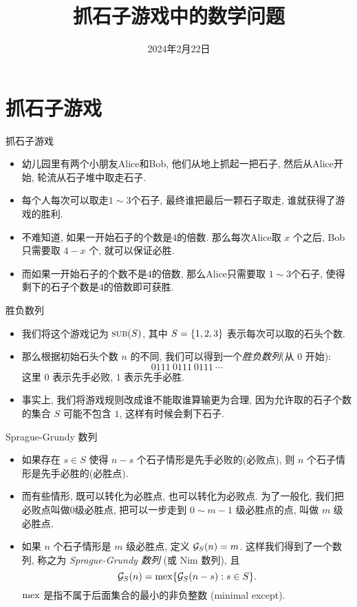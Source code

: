 \documentclass[aspectratio=169,handout]{ctexbeamer}
\title{抓石子游戏中的数学问题}
\date{2024年2月22日}
\DeclareMathOperator*{\SUB}{{\text{{\upshape\textsc{sub}}}}}
\begin{document}
\section{抓石子游戏}
\begin{frame}{抓石子游戏}
	\begin{itemize}
		\item 幼儿园里有两个小朋友Alice和Bob, 他们从地上抓起一把石子, 然后从Alice开始, 轮流从石子堆中取走石子.
		\item 每个人每次可以取走$1\sim3$个石子, 最终谁把最后一颗石子取走, 谁就获得了游戏的胜利.
		\item 不难知道, 如果一开始石子的个数是$4$的倍数. 那么每次Alice取 \alert{$x$} 个之后, Bob只需要取 \alert{$4-x$} 个, 就可以保证必胜.
		\item 而如果一开始石子的个数不是$4$的倍数, 那么Alice只需要取 $1\sim 3$个石子, 使得剩下的石子个数是$4$的倍数即可获胜.
	\end{itemize}
\end{frame}


\begin{frame}{胜负数列}
	\begin{itemize}
		\item 我们将这个游戏记为 $\SUB(S)$, 其中 $S={\left\{1,2,3\right\}}$ 表示每次可以取的石头个数.
		\item 那么根据初始石头个数 $n$ 的不同, 我们可以得到一个\emph{胜负数列}(从 $0$ 开始):
		\[0111\ 0111\ 0111\ \cdots\]
		这里 $0$ 表示先手必败, $1$ 表示先手必胜.
		\item 事实上, 我们将游戏规则改成\alert{谁不能取谁算输}更为合理, 因为允许取的石子个数的集合 $S$ 可能不包含 $1$, 这样有时候会剩下石子.
	\end{itemize}
\end{frame}


\begin{frame}{Sprague-Grundy 数列}
	\begin{itemize}
		\item 如果存在 $s\in S$ 使得 $n-s$ 个石子情形是先手必败的(必败点), 则 $n$ 个石子情形是先手必胜的(必胜点).
		\item 而有些情形, 既可以转化为必胜点, 也可以转化为必败点. 为了一般化, 我们把必败点叫做$0$级必胜点, 把可以一步走到 $0\sim m-1$ 级必胜点的点, 叫做 $m$ 级必胜点.
		\item 如果 $n$ 个石子情形是 $m$ 级必胜点, 定义 ${\mathcal{G}}_S(n)=m$.
		\onslide<+->
		这样我们得到了一个数列, 称之为 \emph{Sprague-Grundy 数列} (或 Nim 数列),
		\onslide<+->
		且
		\[{\mathcal{G}}_S(n)={\mathrm{mex}}{\left\{{\mathcal{G}}_S(n-s): s\in S\right\}}.\]
		${\mathrm{mex}}$ 是指不属于后面集合的最小的非负整数 (minimal except).
	\end{itemize}
\end{frame}
\end{document}
